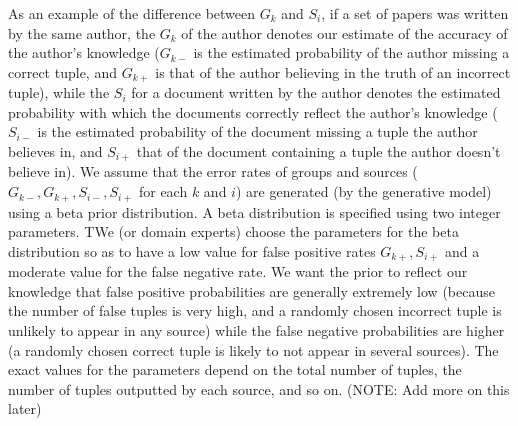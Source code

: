 \documentclass{sig-alternate}
\newcounter{prob}
\begin{document}
As an example of the difference between $G_k$ and $S_i$, if a set of papers was written by the same author, the $G_k$ of the author denotes our estimate of the accuracy of the author's knowledge ($G_{k-}$ is the estimated probability of the author missing a correct tuple, and $G_{k+}$ is that of the author believing in the truth of an incorrect tuple), while the $S_i$ for a document written by the author denotes the estimated probability with which the documents correctly reflect the author's knowledge ($S_{i-}$ is the estimated probability of the document missing a tuple the author believes in, and $S_{i+}$ that of the document containing a tuple the author doesn't believe in). We assume that the error rates of groups and sources ($G_{k-}, G_{k+}, S_{i-}, S_{i+}$ for each $k$ and $i$) are generated (by the generative model) using a beta prior distribution. A beta distribution is specified using two integer parameters. TWe (or domain experts) choose the parameters for the beta distribution so as to have a low value for false positive rates $G_{k+}, S_{i+}$ and a moderate value for the false negative rate. We want the prior to reflect our knowledge that false positive probabilities are generally extremely low (because the number of false tuples is very high, and a randomly chosen incorrect tuple is unlikely to appear in any source) while the false negative probabilities are higher (a randomly chosen correct tuple is likely to not appear in several sources). The exact values for the parameters depend on the total number of tuples, the number of tuples outputted by each source, and so on. (NOTE: Add more on this later)
\end{document}
